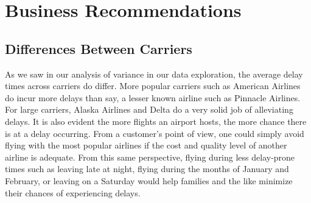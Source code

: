 \documentclass[12pt, a4paper, openany]{book}
\newcommand\tab[1][1cm]{\hspace*{#1}}
\begin{document}
\chapter{Business Recommendations}
	\section{Differences Between Carriers}
	\tab As we saw in our analysis of variance in our data exploration, the average delay times across carriers do differ. More popular carriers such as American Airlines do incur more delays than say, a lesser known airline such as Pinnacle Airlines. For large carriers, Alaska Airlines and Delta do a very solid job of alleviating delays. It is also evident the more flights an airport hosts, the more chance there is at a delay occurring. From a customer’s point of view, one could simply avoid flying with the most popular airlines if the cost and quality level of another airline is adequate. From this same perspective, flying during less delay-prone times such as leaving late at night, flying during the months of January and February, or leaving on a Saturday would help families and the like minimize their chances of experiencing delays. \\
\end{document}
